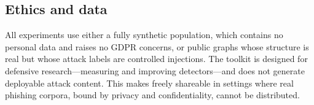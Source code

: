 \subsection{Ethics and data}
All experiments use either a fully synthetic population, which contains no personal data and
raises no GDPR concerns, or public graphs whose structure is real but whose attack labels are
controlled injections. The toolkit is designed for defensive research---measuring and
improving detectors---and does not generate deployable attack content. This makes \tool
freely shareable in settings where real phishing corpora, bound by privacy and
confidentiality, cannot be distributed.